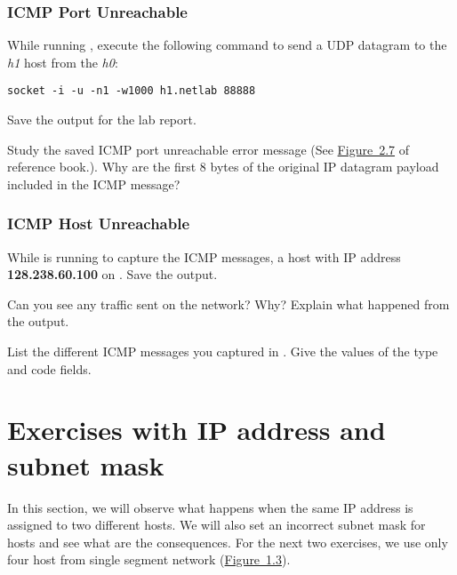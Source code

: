 \documentclass{../UTNetLab}
\begin{document}
\section{ICMP Port Unreachable}
While running , execute the following  command to send a UDP datagram to the \textit{h1} host from the \textit{h0}:

\begin{lstlisting}[emph={h0,h1,netlab}]
socket -i -u -n1 -w1000 h1.netlab 88888
    \end{lstlisting}

Save the  output for the lab report.

\begin{report}
    \item Study the saved ICMP port unreachable error message (See \hyperref[fig:2.7]{Figure~2.7} of reference book.).
    Why are the first 8 bytes of the original IP datagram payload included in the ICMP message?
\end{report}

\section{ICMP Host Unreachable}
While  is running to capture the ICMP messages,  a host with IP address \textbf{128.238.60.100} on .
Save the  output.

\begin{report}
    \item Can you see any traffic sent on the network? Why? Explain what happened from the  output.

    \item List the different ICMP messages you captured in .
    Give the values of the type and code fields.
\end{report}

\part{Exercises with IP address and subnet mask}
In this section, we will observe what happens when the same IP address is assigned to two different hosts.
We will also set an incorrect subnet mask for hosts and see what are the consequences.
For the next two exercises, we use only four host from single segment network (\hyperref[fig:1.3]{Figure~1.3}).
\end{document}
